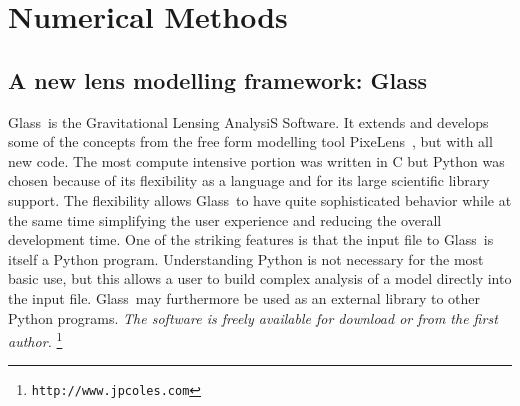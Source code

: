 \documentclass[galley,usenatbib]{mn2e}
\newcommand{\Glass}{{\sc Glass}}
\newcommand{\PixeLens}{{\sc PixeLens}}
\newcommand{\url}[1]{\tt #1}
\begin{document}
\section{Numerical Methods}\label{sec:glass}

\subsection{A new lens modelling framework: \Glass}

\Glass\ is the Gravitational Lensing AnalysiS Software. It extends and develops
some of the concepts from the free form modelling tool \PixeLens\
\citep{Saha2004,2008ApJ...679...17C}, but with all new code.  The most compute
intensive portion was written in C but Python was chosen because of its
flexibility as a language and for its large scientific library support. The
flexibility allows \Glass\ to have quite sophisticated behavior while at the
same time simplifying the user experience and reducing the overall development
time. One of the striking features is that the input file to \Glass\ is itself
a Python program.  Understanding Python is not necessary for the most basic
use, but this allows a user to build complex analysis of a model directly into
the input file. \Glass\ may furthermore be used as an external library to other
Python programs.  {\it The software is freely available for download or from
the first author.}%
%
\footnote{\url{http://www.jpcoles.com}}
\end{document}
